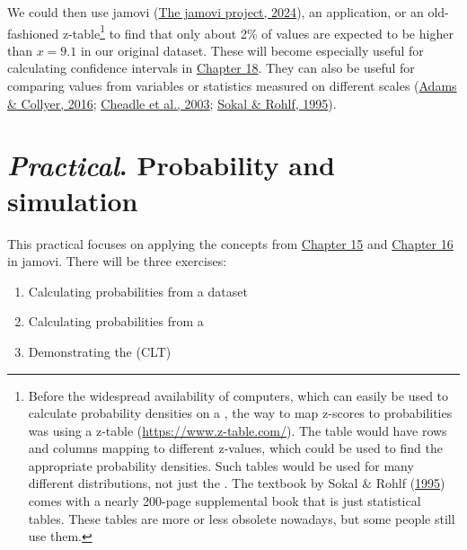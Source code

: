 \documentclass[
  openany]{krantz}
\providecommand{\tightlist}{%
  \setlength{\itemsep}{0pt}\setlength{\parskip}{0pt}}
\begin{document}
We could then use jamovi (\protect\hyperlink{ref-Jamovi2022}{The jamovi project, 2024}), an  application, or an old-fashioned z-table\footnote{Before the widespread availability of computers, which can easily be used to calculate probability densities on a , the way to map z-scores to probabilities was using a z-table (\url{https://www.z-table.com/}). The table would have rows and columns mapping to different z-values, which could be used to find the appropriate probability densities. Such tables would be used for many different distributions, not just the . The textbook by Sokal \& Rohlf (\protect\hyperlink{ref-Sokal1995}{1995}) comes with a nearly 200-page supplemental book that is just statistical tables. These tables are more or less obsolete nowadays, but some people still use them.} to find that only about 2\% of values are expected to be higher than \(x = 9.1\) in our original dataset.
These  will become especially useful for calculating confidence intervals in \protect\hyperlink{Chapter_18}{Chapter 18}.
They can also be useful for comparing values from variables or statistics measured on different scales (\protect\hyperlink{ref-Adams2016}{Adams \& Collyer, 2016}; \protect\hyperlink{ref-Cheadle2003}{Cheadle et al., 2003}; \protect\hyperlink{ref-Sokal1995}{Sokal \& Rohlf, 1995}).

\hypertarget{Chapter_17}{%
\chapter{\texorpdfstring{\emph{Practical}. Probability and simulation}{Practical. Probability and simulation}}\label{Chapter_17}}

This practical focuses on applying the concepts from \protect\hyperlink{Chapter_15}{Chapter 15} and \protect\hyperlink{Chapter_16}{Chapter 16} in jamovi.
There will be three exercises:

\begin{enumerate}
\def\labelenumi{\arabic{enumi}.}
\tightlist
\item
  Calculating probabilities from a dataset
\item
  Calculating probabilities from a 
\item
  Demonstrating the  (CLT)
\end{enumerate}
\end{document}

